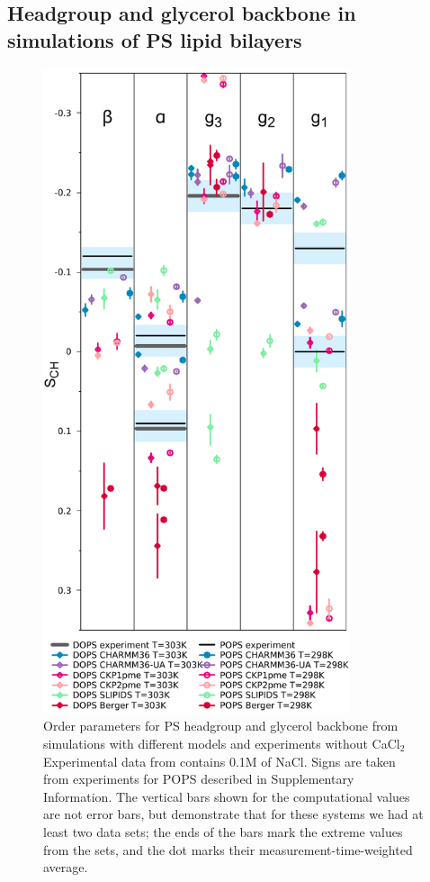 \documentclass[aps,prl,superscriptaddress,twocolumn]{revtex4}
\begin{document}
\subsection{Headgroup and glycerol backbone in simulations of PS lipid bilayers}
\begin{figure}[]
  \centering
  \includegraphics[width=9.0cm]{../Figs/HGorderparametersPS.pdf}
  \caption{\label{HGorderParametersPS}
    Order parameters for PS headgroup and glycerol
    backbone from simulations with different models and experiments without CaCl$_2$ 
    Experimental data from \cite{browning80} contains 0.1M of NaCl.
    Signs are taken from experiments for POPS described in Supplementary Information.
    The vertical bars shown for the computational values are not error bars, but demonstrate that for these systems we had at least two data sets; the ends of the bars mark the extreme values from the sets, and the dot marks their measurement-time-weighted average.
  }
\end{figure}
\end{document}
